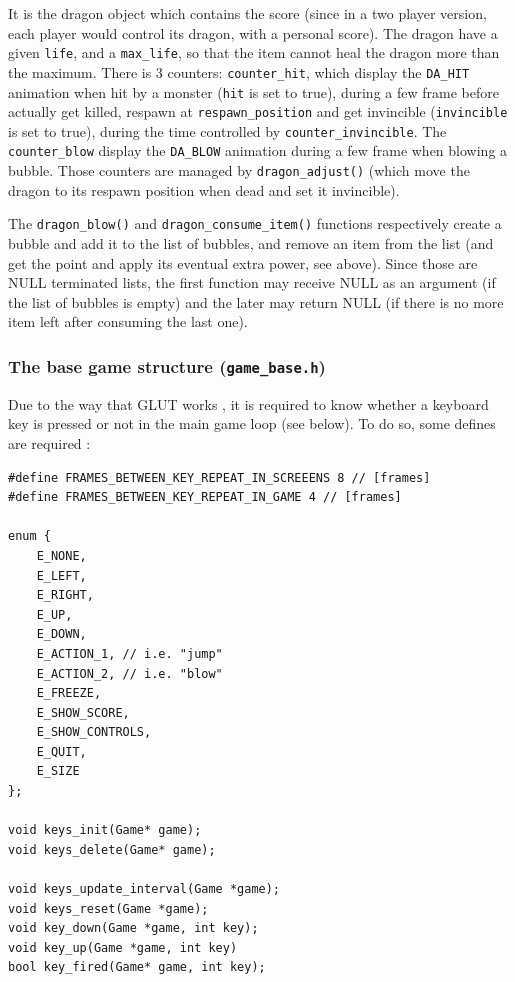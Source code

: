 \documentclass[12pt,a4paper]{article}
\newcommand{\cc}[1]{\texttt{#1}}
\begin{document}
It is the dragon object which contains the score (since in a two player version, each player would control its dragon, with a personal score). The dragon have a given \cc{life}, and a \cc{max_life}, so that the item cannot heal the dragon more than the maximum. There is 3 counters: \cc{counter_hit}, which display the \cc{DA_HIT} animation when hit by a monster (\cc{hit} is set to true), during a few frame before actually get killed, respawn at \cc{respawn_position} and get invincible (\cc{invincible} is set to true), during the time controlled by \cc{counter_invincible}. The \cc{counter_blow} display the \cc{DA_BLOW} animation during a few frame when blowing a bubble. Those counters are managed by \cc{dragon_adjust()} (which move the dragon to its respawn position when dead and set it invincible).

The \cc{dragon_blow()} and \cc{dragon_consume_item()} functions respectively create a bubble and add it to the list of bubbles, and remove an item from the list (and get the point and apply its eventual extra power, see above). Since those are NULL terminated lists, the first function may receive NULL as an argument (if the list of bubbles is empty) and the later may return NULL (if there is no more item left after consuming the last one).

\subsubsection{The base game structure (\texttt{game\_base.h})}

Due to the way that GLUT works \cite{freeglut},  it is required to know whether a keyboard key is pressed or not in the main game loop (see below). To do so, some defines are required :\begin{verbatim}
#define FRAMES_BETWEEN_KEY_REPEAT_IN_SCREEENS 8 // [frames]
#define FRAMES_BETWEEN_KEY_REPEAT_IN_GAME 4 // [frames]

enum {
    E_NONE,
    E_LEFT,
    E_RIGHT,
    E_UP,
    E_DOWN,
    E_ACTION_1, // i.e. "jump"
    E_ACTION_2, // i.e. "blow"
    E_FREEZE,
    E_SHOW_SCORE,
    E_SHOW_CONTROLS,
    E_QUIT,
    E_SIZE
};

void keys_init(Game* game);
void keys_delete(Game* game);

void keys_update_interval(Game *game);
void keys_reset(Game *game);
void key_down(Game *game, int key);
void key_up(Game *game, int key)
bool key_fired(Game* game, int key);
\end{verbatim}
\end{document}
